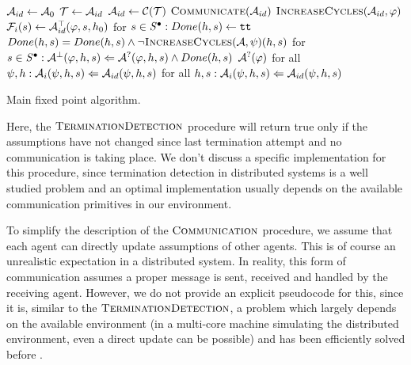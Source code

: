 \begin{algorithm}
	\begin{algorithmic}[1]
		\State $\mathcal{A}_{id} \gets \mathcal{A}_0$
		\Repeat
		\Repeat
		\Repeat
		\State $\mathcal{T} \gets \mathcal{A}_{id}$
		\State $\mathcal{A}_{id} \gets \mathcal{C}(\mathcal{T})$
		\State $\Call{Communicate}{\assume_{id}}$
		\State $\Call{IncreaseCycles}{\assume_{id}, \varphi}$
		\State $\mathcal{F}_i(s) \gets \mathcal{A}^\top_{id}(\varphi, s, h_0)$
		\EndFunction
			\State for $s \in \mathit{S}^\bullet : Done(h, s) \gets \texttt{tt} $
				\State $Done(h, s) = Done(h, s) \land \neg \Call{IncreaseCycles}{\mathcal{A}, \psi}(h, s)$
			\EndFor
			\State for $s \in \mathit{S}^\bullet : \mathcal{A}^\bot(\varphi, h, s) \Leftarrow \mathcal{A}^?(\varphi, h, s) \land Done(h,s)$
			\State \Return $\mathcal{A}^?(\varphi)$
		\EndFunction
					\State for all $\psi,h : \mathcal{A}_i(\psi, h, s) \Leftarrow \mathcal{A}_{id}(\psi, h, s)$
				\EndFor
					\State for all $h, s : \mathcal{A}_i(\psi, h, s) \Leftarrow \mathcal{A}_{id}(\psi, h, s)$
				\EndFor
			\EndFor
		\EndFunction
	\end{algorithmic}	

	\caption{Main fixed point algorithm.}
	\label{alg:main}
\end{algorithm}

Here, the $\textsc{TerminationDetection}$ procedure will return true only if the assumptions have not changed since last termination attempt and no communication is taking place. We don't discuss a specific implementation for this procedure, since termination detection in distributed systems is a well studied problem \cite{termination} and an optimal implementation usually depends on the available communication primitives in our environment.

To simplify the description of the $\textsc{Communication}$ procedure, we assume that each agent can directly update assumptions of other agents. This is of course an unrealistic expectation in a distributed system. In reality, this form of communication assumes a proper message is sent, received and handled by the receiving agent. However, we do not provide an explicit pseudocode for this, since it is, similar to the $\textsc{TerminationDetection}$, a problem which largely depends on the available environment (in a multi-core machine simulating the distributed environment, even a direct update can be possible) and has been efficiently solved before \cite{comm}.

